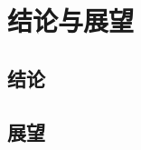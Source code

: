 %
\chapter{结论与展望}\label{chapter5}
\vbox{}\vbox{}
\section{结论}
\vbox{}

  
\vbox{}
  \section{展望}
\vbox{}
    
